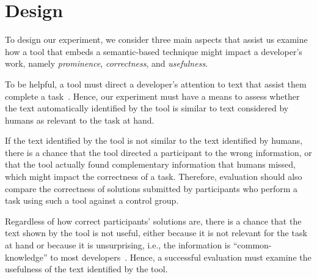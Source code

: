
\section{Design}
\label{cp6:design}




To design our experiment, we consider three main aspects that assist us examine how a tool that embeds a semantic-based technique might impact a developer's work, namely \textit{prominence}, \textit{correctness}, and \textit{usefulness}.




\begin{description}[leftmargin=\parindent, font=\normalfont\itshape]
    
    \item[Prominence.] To be helpful, a tool must direct a developer's attention to text that assist them complete a task~\cite{Robillard2015}.
    Hence, our experiment must have a means to assess whether the text automatically identified by the tool is similar to text considered by humans as relevant to the task at hand. 


    \item[Correctness.] If the text identified by the tool is not similar to the text identified by humans,
    there is a chance that the tool directed a participant to the wrong information, or that 
    the tool actually found complementary information that humans missed, which might impact the correctness of a task. 
    Therefore, evaluation should also compare the correctness of solutions submitted by participants who perform a task using such a tool against a control group.

    \item[Usefulness.] Regardless of how correct participants' solutions are, there is a chance that the text shown by the tool is not useful, either because it is not relevant for the task at hand or because it is unsurprising, i.e., the information is ``common-knowledge'' to most developers~\cite{cwalina2008, Robillard2015}. Hence, a successful evaluation must
    examine the usefulness of the text identified by the tool. 
    
\end{description}









